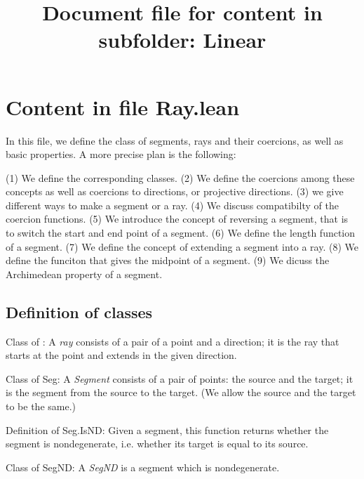 \documentclass[12pt,a4paper]{article}
\title{Document file for content in subfolder: Linear}
\begin{document}
\section{Content in file Ray.lean}

In this file, we define the class of segments, rays and their coercions, as well as basic properties.  A more precise plan is the following:

(1) We define the corresponding classes. 
(2) We define the coercions among these concepts as well as coercions to directions, or projective directions.
(3) we give different ways to make a segment or a ray.
(4) We discuss compatibilty of the coercion functions.
(5) We introduce the concept of reversing a segment, that is to switch the start and end point of a segment.
(6) We define the length function of a segment.
(7) We define the concept of extending a segment into a ray.
(8) We define the funciton that gives the midpoint of a segment.
(9) We dicuss the Archimedean property of a segment.

\subsection{Definition of classes}

Class of : A \emph{ray} consists of a pair of a point and a direction; it is the ray that starts at the point and extends in the given direction.

Class of Seg: A \emph{Segment} consists of a pair of points: the source and the target; it is the segment from the source to the target. (We allow the source and the target to be the same.)

Definition of Seg.IsND: Given a segment, this function returns whether the segment is nondegenerate, i.e. whether its target is equal to its source.

Class of SegND: A \emph{SegND} is a segment which is nondegenerate.
\end{document}
